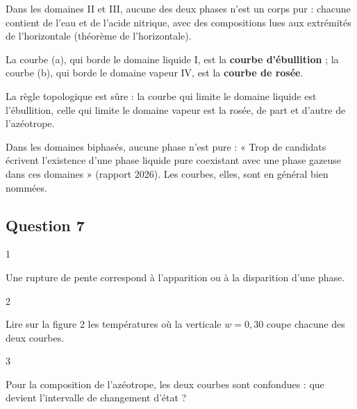 \documentclass[11pt,a4paper]{article}
\begin{document}
Dans les domaines II et III, aucune des deux phases n'est un corps pur : chacune contient de l'eau et de l'acide nitrique, avec des compositions lues aux extrémités de l'horizontale (théorème de l'horizontale).

La courbe (a), qui borde le domaine liquide I, est la \textbf{courbe d'ébullition} ; la courbe (b), qui borde le domaine vapeur IV, est la \textbf{courbe de rosée}.

\begin{methode}

La règle topologique est sûre : la courbe qui limite le domaine liquide est l'ébullition, celle qui limite le domaine vapeur est la rosée, de part et d'autre de l'azéotrope.

\end{methode}

\begin{piege}

Dans les domaines biphasés, aucune phase n'est pure : « Trop de candidats écrivent l'existence d'une phase liquide pure coexistant avec une phase gazeuse dans ces domaines » (rapport 2026). Les courbes, elles, sont en général bien nommées.

\end{piege}

\hypertarget{question-7}{%
\subsection{Question 7}\label{question-7}}

\begin{indication}{1}

Une rupture de pente correspond à l'apparition ou à la disparition d'une phase.

\end{indication}

\begin{indication}{2}

Lire sur la figure 2 les températures où la verticale \(w=0{,}30\) coupe chacune des deux courbes.

\end{indication}

\begin{indication}{3}

Pour la composition de l'azéotrope, les deux courbes sont confondues : que devient l'intervalle de changement d'état ?

\end{indication}
\end{document}
